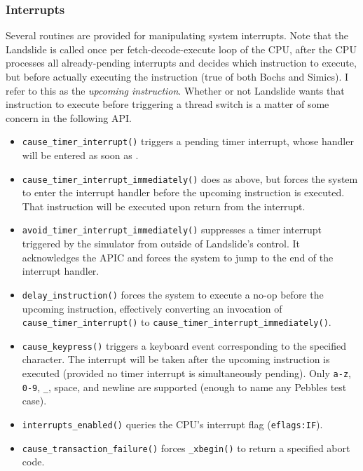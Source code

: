 \subsubsection{Interrupts}
\label{sec:landslide-interrupce}

Several routines are provided for manipulating system interrupts.
Note that the Landslide is called once per fetch-decode-execute loop of the CPU,
after the CPU processes all already-pending interrupts and decides which instruction to execute,
but before actually executing the instruction
(true of both Bochs and Simics).
I refer to this as the {\em upcoming instruction}.
Whether or not Landslide wants that instruction to execute before triggering a thread switch is a matter of some concern in the following API.

\begin{itemize}
	\item {\tt cause\_timer\_interrupt()}
		triggers a pending timer interrupt, whose handler will be entered as soon as
		.
	\item {\tt cause\_timer\_interrupt\_immediately()}
		does as above, but forces the system to enter the interrupt handler before the upcoming instruction is executed.
		That instruction will be executed upon return from the interrupt.
	\item {\tt avoid\_timer\_interrupt\_immediately()}
		suppresses a timer interrupt triggered by the simulator from outside of Landslide's control.
		It acknowledges the APIC and forces the system to jump to the end of the interrupt handler.
	\item {\tt delay\_instruction()}
		forces the system to execute a no-op before the upcoming instruction,
		effectively converting an invocation of {\tt cause\_timer\_interrupt()} to {\tt cause\_timer\_interrupt\_immediately()}.
	\item {\tt cause\_keypress()} triggers a keyboard event corresponding to the specified character.
		The interrupt will be taken after the upcoming instruction is executed
		(provided no timer interrupt is simultaneously pending).
		Only {\tt a-z}, {\tt 0-9}, {\tt \_}, space, and newline are supported (enough to name any Pebbles test case).
	\item {\tt interrupts\_enabled()} queries the CPU's interrupt flag ({\tt eflags:IF}).
	\item {\tt cause\_transaction\_failure()} forces {\tt \_xbegin()} to return a specified abort code.
\end{itemize}

